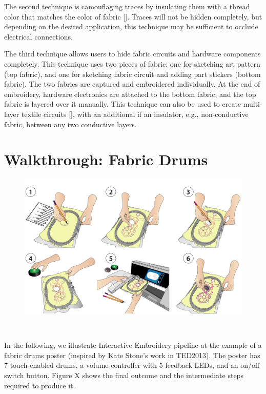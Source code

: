 \documentclass[header.tex]{subfiles}
\begin{document}
The second technique is camouflaging traces by insulating them with a thread color that matches the color of fabric []. Traces will not be hidden completely, but depending on the desired application, this technique may be sufficient to occlude electrical connections. 

The third technique allows users to hide fabric circuits and hardware components completely. This technique uses two pieces of fabric: one for sketching art pattern (top fabric), and one for sketching fabric circuit and adding part stickers (bottom fabric). The two fabrics are captured and embroidered individually. At the end of embroidery, hardware electronics are attached to the bottom fabric, and the top fabric is layered over it manually. This technique can also be used to create multi-layer textile circuits [], with an additional if an insulator, e.g., non-conductive fabric, between any two conductive layers. 







\section{Walkthrough: Fabric Drums}

\begin{figure}
\centering
  \includegraphics[width=0.9\columnwidth]{figures/Walkthrough}
  \caption{}~\label{fig:Walkthrough}
  \vspace{-2.5em}
\end{figure}
In the following, we illustrate Interactive Embroidery pipeline at the example of a fabric drums poster (inspired by Kate Stone's work in TED2013). The poster has 7 touch-enabled drums, a volume controller with 5 feedback LEDs, and an on/off switch button. Figure X shows the final outcome and the intermediate steps required to produce it.
\end{document}
